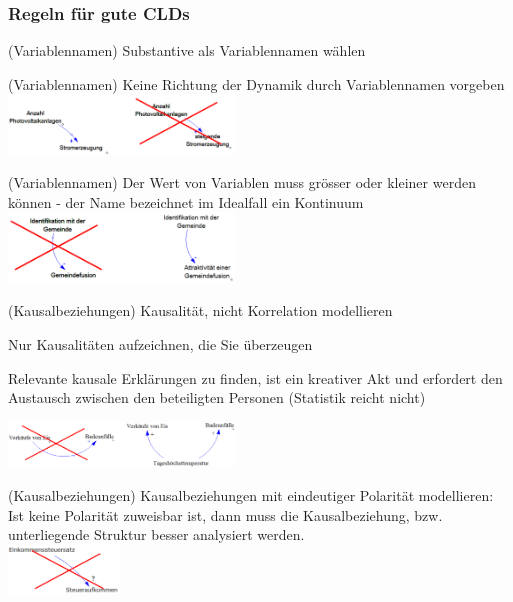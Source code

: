 \newpage

\subsubsection{Regeln für gute CLDs}
\begin{multicols}{2}
	\begin{compactenum}
		\item (Variablennamen) Substantive als Variablennamen wählen
		\item (Variablennamen) Keine Richtung der Dynamik durch Variablennamen vorgeben \\
		\includegraphics[width=0.45\textwidth]{pictures/regel_2}
		\item (Variablennamen) Der Wert von Variablen muss grösser oder kleiner werden können - der Name bezeichnet im Idealfall ein Kontinuum \\
		\includegraphics[width=0.45\textwidth]{pictures/regel_3}
		\item (Kausalbeziehungen) Kausalität, nicht Korrelation modellieren
		\begin{compactitem}
			\item Nur Kausalitäten aufzeichnen, die Sie überzeugen
			\item Relevante kausale Erklärungen zu finden, ist ein kreativer Akt und erfordert den Austausch zwischen den beteiligten Personen (Statistik	reicht nicht)
		\end{compactitem}
		\includegraphics[width=0.45\textwidth]{pictures/regel_4}
		\item (Kausalbeziehungen) Kausalbeziehungen mit eindeutiger Polarität modellieren: Ist keine Polarität zuweisbar ist, dann muss die	Kausalbeziehung, bzw. unterliegende Struktur besser	analysiert werden. \\
		\includegraphics[width=0.225\textwidth]{pictures/regel_5} 

\end{compactenum}
\end{multicols}
